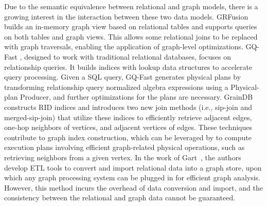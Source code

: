  Due to the semantic equivalence between relational and graph models, there is a growing interest in the interaction between these two data models. GRFusion \cite{GRFusion} builds an in-memory graph view based on relational tables and supports queries on both tables and graph views. This allows some relational joins to be replaced with graph traversals, enabling the application of graph-level optimizations. GQ-Fast \cite{gqfast}, designed to work with traditional relational databases, focuses on relationship queries. It builds indices with lookup data structures to accelerate query processing. Given a SQL query, GQ-Fast generates physical plans by transforming relationship query normalized algebra expressions using a Physical-plan Producer, and further optimizations for the plans are necessary. GrainDB \cite{graindb} constructs RID indices and introduces two new join methods (i.e., sip-join and merged-sip-join) that utilize these indices to efficiently retrieve adjacent edges, one-hop neighbors of vertices, and adjacent vertices of edges. These techniques contribute to graph index construction, which can be leveraged by \name to compute execution plans involving efficient graph-related physical operations, such as retrieving neighbors from a given vertex. In the work of Gart~\cite{gart}, the authors develop ETL tools to convert and import relational data into a graph store, upon which any graph processing system can be plugged in for efficient graph analysis. However, this method incurs the overhead of data conversion and import, and the consistency between the relational and graph data cannot be guaranteed.






